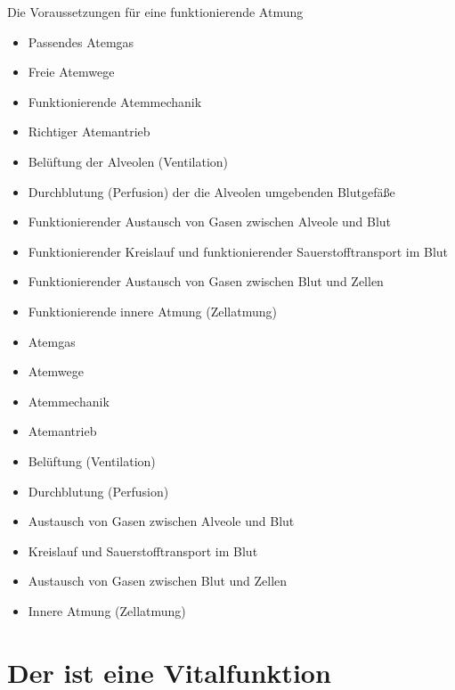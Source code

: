 \TextSlide
{Die Voraussetzungen für eine funktionierende Atmung}%
{%
\begin{itemize}
  \item Passendes Atemgas
  \item Freie Atemwege
  \item Funktionierende Atemmechanik
  \item Richtiger Atemantrieb
  \item Belüftung der Alveolen (Ventilation)
  \item Durchblutung (Perfusion) der die Alveolen umgebenden Blutgefäße
  \item Funktionierender Austausch von Gasen zwischen Alveole und Blut
  \item Funktionierender Kreislauf und funktionierender Sauerstofftransport im Blut
  \item Funktionierender Austausch von Gasen zwischen Blut und Zellen
  \item Funktionierende innere Atmung (Zellatmung)  
\end{itemize}}%
{%
\begin{itemize}
  \item Atemgas
  \item Atemwege
  \item Atemmechanik
  \item Atemantrieb
  \item Belüftung (Ventilation)
  \item Durchblutung (Perfusion) 
  \item Austausch von Gasen zwischen Alveole und Blut
  \item Kreislauf und Sauerstofftransport im Blut
  \item Austausch von Gasen zwischen Blut und Zellen
  \item Innere Atmung (Zellatmung)  
\end{itemize}}%





\clearpage






\clearpage %
\section{Der  ist eine Vitalfunktion}
\label{topic:blutkreislauf} 
\label{topic:vitalfunktion-kreislauf}





